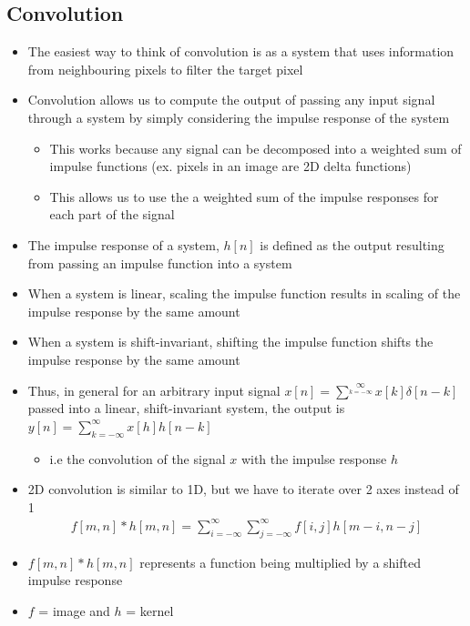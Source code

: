 \documentclass[letterpaper,12pt]{article}
\begin{document}
\subsection{Convolution}
\begin{itemize}
 \item The easiest way to think of convolution is as a system that uses information from neighbouring pixels to filter the target pixel
 \item Convolution allows us to compute the output of passing any input signal through a system by simply considering the impulse response of the system
       \begin{itemize}
        \item This works because any signal can be decomposed into a weighted sum of impulse functions (ex. pixels in an image are 2D delta functions)
        \item This allows us to use the a weighted sum of the impulse responses for each part of the signal
       \end{itemize}
 \item The impulse response of a system, $h[n]$ is defined as the output resulting from passing an impulse function into a system
 \item When a system is linear, scaling the impulse function results in scaling of the impulse response by the same amount
 \item When a system is shift-invariant, shifting the impulse function shifts the impulse response by the same amount
 \item Thus, in general for an arbitrary input signal $x[n]= \sum\limits^{\infty}\limits_{k=-\infty} x[k] \delta [n-k]$ passed into a linear, shift-invariant system, the output is $y[n] = \sum\limits^{\infty}_{k=-\infty} x[h]h[n-k]$
       \begin{itemize}
        \item i.e the convolution of the signal $x$ with the impulse response $h$
       \end{itemize}
 \item 2D convolution is similar to 1D, but we have to iterate over 2 axes instead of 1
       \begin{align}
        f[m,n] * h[m,n] = \sum\limits_{i = -\infty}^{\infty}\sum\limits_{j = -\infty}^{\infty} f[i, j] h[m-i,n-j]
       \end{align}
 \item $f[m,n]*h[m,n]$ represents a function being multiplied by a shifted impulse response
 \item $f$ = image and $h$ = kernel
\end{itemize}
\end{document}
